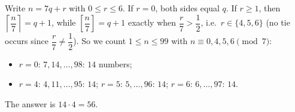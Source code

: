 Write $n=7q+r$ with $0\le r\le6$. If $r=0$, both sides equal $q$. If $r\ge1$, then $\left\lceil\dfrac {n}{7}\right\rceil=q+1$, while $\left[\dfrac {n}{7}\right]=q+1$ exactly when $\dfrac {r}{7}>\dfrac{1}{2}$, i.e.\ $r\in\{4,5,6\}$ (no tie occurs since $\dfrac {r}{7}\ne\dfrac{1}{2}$). So we count $1\le n\le99$ with $n\equiv0,4,5,6\pmod7$:
\begin{itemize}
\item $r=0$: $7,14,\dots,98$: $14$ numbers;
\item $r=4$: $4,11,\dots,95$: $14$; $r=5$: $5,\dots,96$: $14$; $r=6$: $6,\dots,97$: $14$.
\end{itemize}
The answer is $14\cdot4=\boxed{56}$.

